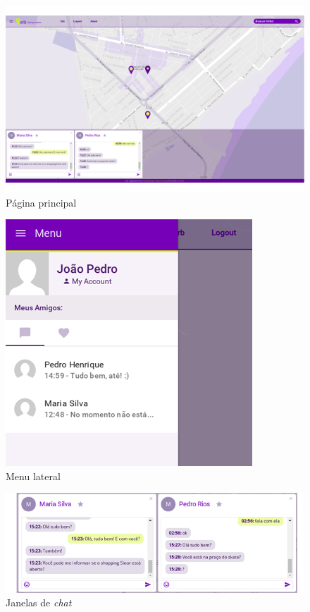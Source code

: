 \begin{figure}[!htb]
	\centering
	\includegraphics[scale=0.37]{imagens/pagina.png}
	\caption{\small Página principal}
	\label{fig:pagina}
\end{figure}

\begin{figure}[!htb]
	\centering
	\includegraphics[scale=1]{imagens/aside_menu.png}
	\caption{\small Menu lateral}
	\label{fig:aside-menu}
\end{figure}

\begin{figure}[!htb]
	\centering
	\includegraphics[scale=1]{imagens/chat_panel.png}
	\caption{\small Janelas de \textit{chat}}
	\label{fig:chat-panel}
\end{figure}

